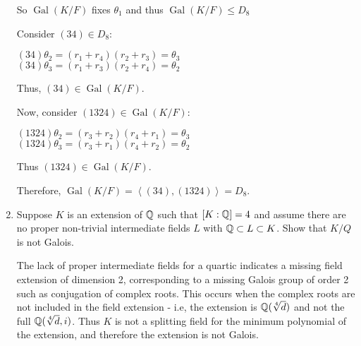 \documentclass[letterpaper,12pt,fleqn]{article}
\renewcommand{\o}{\theta}
\DeclareMathOperator{\Gal}{Gal}
\begin{document}
\begin{enumerate}
  So $\Gal(K/F)$ fixes $\o_1$ and thus $\Gal(K/F)\le D_8$

  Consider $(34)\in D_8$:

  $(34)\o_2=(r_1+r_4)(r_2+r_3)=\o_3$ \\
  $(34)\o_3=(r_1+r_3)(r_2+r_4)=\o_2$

  Thus, $(34)\in\Gal(K/F)$.

  Now, consider $(1324)\in\Gal(K/F)$:

  $(1324)\o_2=(r_3+r_2)(r_4+r_1)=\o_3$ \\
  $(1324)\o_3=(r_3+r_1)(r_4+r_2)=\o_2$

  Thus $(1324)\in\Gal(K/F)$.

  Therefore, $\Gal(K/F)=\left<(34),(1324)\right>=D_8$.

\item Suppose $K$ is an extension of $\mathbb{Q}$ such that $[K:\mathbb{Q}]=4$ and assume there are no
  proper non-trivial intermediate fields $L$ with $\mathbb{Q}\subset L\subset K$. Show that
  $K/Q$ is not Galois.

  The lack of proper intermediate fields for a quartic indicates a missing field
  extension of dimension 2, corresponding to a missing Galois group of order 2 such as
  conjugation of complex roots. This occurs when the complex roots are not included in
  the field extension - i.e, the extension is $\mathbb{Q}(\sqrt[4]{d})$ and not the full
  $\mathbb{Q}(\sqrt[4]{d},i)$. Thus $K$ is not a splitting field for the minimum polynomial of
  the extension, and therefore the extension is not Galois.
\end{enumerate}
\end{document}
